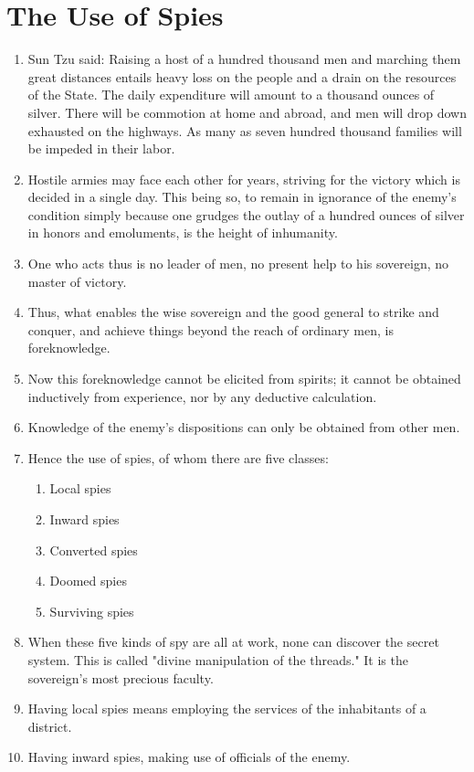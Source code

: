 \documentclass[oneside]{book}
\begin{document}
\chapter{The Use of Spies}
\begin{enumerate}
	\item Sun Tzu said: Raising a host of a hundred thousand men and marching them great distances entails heavy loss on the people and a drain on the resources of the State. The daily expenditure will amount to a thousand ounces of silver. There will be commotion at home and abroad, and men will drop down exhausted on the highways. As many as seven hundred thousand families will be impeded in their labor.
	\item Hostile armies may face each other for years, striving for the victory which is decided in a single day. This being so, to remain in ignorance of the enemy's condition simply because one grudges the outlay of a hundred ounces of silver in honors and emoluments, is the height of inhumanity.
	\item One who acts thus is no leader of men, no present help to his sovereign, no master of victory.
	\item Thus, what enables the wise sovereign and the good general to strike and conquer, and achieve things beyond the reach of ordinary men, is foreknowledge.
	\item Now this foreknowledge cannot be elicited from spirits; it cannot be obtained inductively from experience, nor by any deductive calculation.
	\item Knowledge of the enemy's dispositions can only be obtained from other men.
	\item Hence the use of spies, of whom there are five classes:
	\begin{enumerate}
		\item Local spies
		\item Inward spies
		\item Converted spies
		\item Doomed spies
		\item Surviving spies
	\end{enumerate}
	\item When these five kinds of spy are all at work, none can discover the secret system. This is called "divine manipulation of the threads." It is the sovereign's most precious faculty.
	\item Having local spies means employing the services of the inhabitants of a district.
	\item Having inward spies, making use of officials of the enemy.

\end{enumerate}
\end{document}
